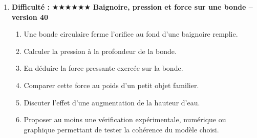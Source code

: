 \documentclass[11pt,a4paper]{article}
\newcommand{\etoiles}[1]{\textbf{Difficulté : }#1}
\begin{document}
\begin{enumerate}[label=\textbf{Problème long \arabic*.},leftmargin=*]
\begin{enumerate}[label=\alph*)]
\end{enumerate}
\item \etoiles{★★★★★★}
\textbf{Baignoire, pression et force sur une bonde -- version 40}
\begin{enumerate}[label=\alph*)]
\item Une bonde circulaire ferme l'orifice au fond d'une baignoire remplie.
\item Calculer la pression à la profondeur de la bonde.
\item En déduire la force pressante exercée sur la bonde.
\item Comparer cette force au poids d'un petit objet familier.
\item Discuter l'effet d'une augmentation de la hauteur d'eau.
\item Proposer au moins une vérification expérimentale, numérique ou graphique permettant de tester la cohérence du modèle choisi.
\end{enumerate}
\end{enumerate}
\end{document}
